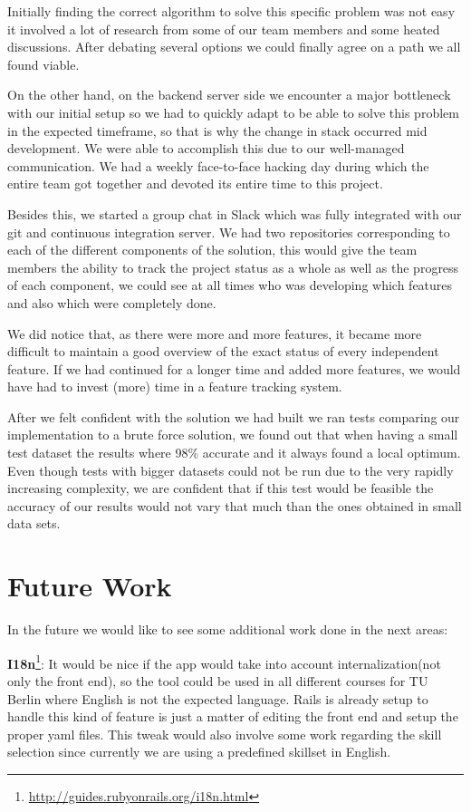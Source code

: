 Initially finding the correct algorithm to solve this specific problem was not easy it involved a lot of research from some of our team members and some heated discussions. After debating several options we could finally agree on a path we all found viable.

On the other hand, on the backend server side we encounter a major bottleneck with our initial setup so we had to quickly adapt to be able to solve this problem in the expected timeframe, so that is why the change in stack occurred mid development. We were able to accomplish this due to our well-managed communication. We had a weekly face-to-face hacking day during which the entire team got together and devoted its entire time to this project.

Besides this, we started a group chat in Slack which was fully integrated with our git and continuous integration server. We had two repositories corresponding to each of the different components of the solution, this would give the team members the ability to track the project status as a whole as well as the progress of each component, we could see at all times who was developing which features and also which were completely done. 

We did notice that, as there were more and more features, it became more difficult to maintain a good overview of the exact status of every independent feature. If we had continued for a longer time and added more features, we would have had to invest (more) time in a feature tracking system.

After we felt confident with the solution we had built we ran tests comparing our implementation to a brute force solution, we found out that when having a small test dataset the results where 98\% accurate and it always found a local optimum. Even though tests with bigger datasets could not be run due to the very rapidly increasing complexity, we are confident that if this test would be feasible the accuracy of our results would not vary that much than the ones obtained in small data sets.

\section{Future Work}
In the future we would like to see some additional work done in the next areas:

\textbf{I18n}\footnote{\url{http://guides.rubyonrails.org/i18n.html}}: It would be nice if the app would take into account internalization(not only the front end), so the tool could be used in all different courses for TU Berlin where English is not the expected language. Rails is already setup to handle this kind of feature is just a matter of editing the front end and setup the proper yaml files. This tweak would also involve some work regarding the skill selection since currently we are using a predefined skillset in English.

